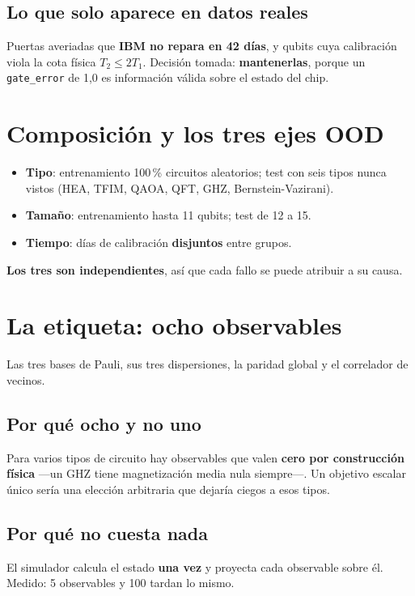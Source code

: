 \subsection{Lo que solo aparece en datos reales}
Puertas averiadas que \textbf{IBM no repara en 42 días}, y qubits cuya calibración viola la
cota física $T_2 \leq 2T_1$. Decisión tomada: \textbf{mantenerlas}, porque un
\texttt{gate\_error} de 1,0 es información válida sobre el estado del chip.

\section{Composición y los tres ejes OOD}
\label{sec:ejes}
\begin{itemize}
    \item \textbf{Tipo}: entrenamiento 100\,\% circuitos aleatorios; test con seis tipos nunca
          vistos (HEA, TFIM, QAOA, QFT, GHZ, Bernstein-Vazirani).
    \item \textbf{Tamaño}: entrenamiento hasta 11 qubits; test de 12 a 15.
    \item \textbf{Tiempo}: días de calibración \textbf{disjuntos} entre grupos.
\end{itemize}
\textbf{Los tres son independientes}, así que cada fallo se puede atribuir a su causa.

\section{La etiqueta: ocho observables}
\label{sec:observables}
Las tres bases de Pauli, sus tres dispersiones, la paridad global y el correlador de vecinos.

\subsection{Por qué ocho y no uno}
Para varios tipos de circuito hay observables que valen \textbf{cero por construcción física}
—un GHZ tiene magnetización media nula siempre—. Un objetivo escalar único sería una elección
arbitraria que dejaría ciegos a esos tipos.

\subsection{Por qué no cuesta nada}
El simulador calcula el estado \textbf{una vez} y proyecta cada observable sobre él. Medido:
5 observables y 100 tardan lo mismo.

